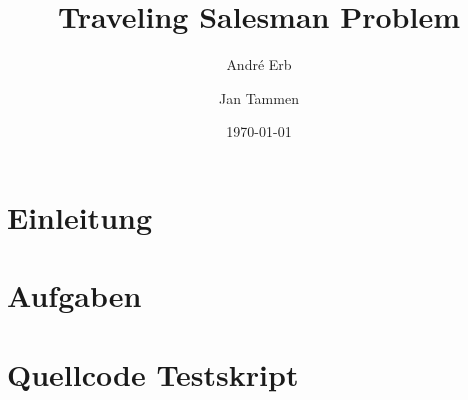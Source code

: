 \documentclass[
	a4paper,     		%
	headsepline, 		%
	footsepline, 		%
	titlepage,   		%
	12pt,        		%
	liststotoc,			%
]{scrreprt}
\title{Traveling Salesman Problem}
\author{%
	André Erb
	\and{%
		Jan Tammen
	}%
}%
\date{\today}
\begin{document}
\maketitle

\tableofcontents

\chapter{Einleitung}


\chapter{Aufgaben}




\cleardoublepage %
{}

\appendix
\pdfbookmark[-1]{\appendixname}{\appendixname} 

\chapter{Quellcode Testskript}




\renewcommand{\bibname}{Quellen}


\end{document}
